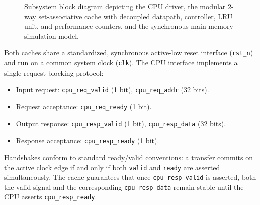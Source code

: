 \documentclass[conference]{IEEEtran}
\begin{document}
\begin{figure}[t!]
\caption{Subsystem block diagram depicting the CPU driver, the modular 2-way set-associative cache with decoupled datapath, controller, LRU unit, and performance counters, and the synchronous main memory simulation model.}
\label{fig:sys_arch}
\end{figure}

Both caches share a standardized, synchronous active-low reset interface (\texttt{rst\_n}) and run on a common system clock (\texttt{clk}). The CPU interface implements a single-request blocking protocol:
\begin{itemize}
    \item Input request: \texttt{cpu\_req\_valid} (1 bit), \texttt{cpu\_req\_addr} (32 bits).
    \item Request acceptance: \texttt{cpu\_req\_ready} (1 bit).
    \item Output response: \texttt{cpu\_resp\_valid} (1 bit), \texttt{cpu\_resp\_data} (32 bits).
    \item Response acceptance: \texttt{cpu\_resp\_ready} (1 bit).
\end{itemize}
Handshakes conform to standard ready/valid conventions: a transfer commits on the active clock edge if and only if both \texttt{valid} and \texttt{ready} are asserted simultaneously. The cache guarantees that once \texttt{cpu\_resp\_valid} is asserted, both the valid signal and the corresponding \texttt{cpu\_resp\_data} remain stable until the CPU asserts \texttt{cpu\_resp\_ready}.
\end{document}
